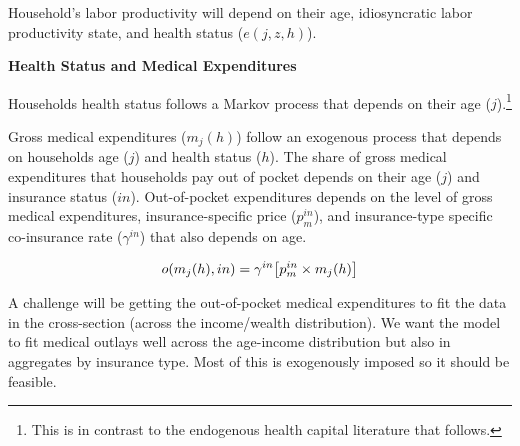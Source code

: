 \documentclass[11pt,leqno,fleqn]{article}
\newcommand{\be}{\vspace{-1em}\begin{singlespace}\begin{equation}}
\newcommand{\ee}{\end{equation}\end{singlespace}}
\begin{document}
Household's labor productivity will depend on their age, idiosyncratic labor productivity state, and health status ($e(j,z,h)$). 

\begin{flushleft}
\textbf{Health Status and Medical Expenditures}
\end{flushleft}
Households health status follows a Markov process that depends on their age ($j$).\footnote{This is in contrast to the endogenous health capital literature that \citet{Jung:2017} follows.}

Gross medical expenditures ($m_j(h)$) follow an exogenous process that depends on households age ($j$) and health status ($h$). The share of gross medical expenditures that households pay out of pocket depends on their age ($j$) and insurance status ($in$). Out-of-pocket expenditures depends on the level of gross medical expenditures, insurance-specific price ($p_m^{in}$), and insurance-type specific co-insurance rate ($\gamma^{in}$) that also depends on age.

\be o(m_j(h),in)=\gamma^{in}\big[p_m^{in}\times m_j(h)\big] \notag \ee

A challenge will be getting the out-of-pocket medical expenditures to fit the data in the cross-section (across the income/wealth distribution). We want the model to fit medical outlays well across the age-income distribution but also in aggregates by insurance type. Most of this is exogenously imposed so it should be feasible.
\end{document}
